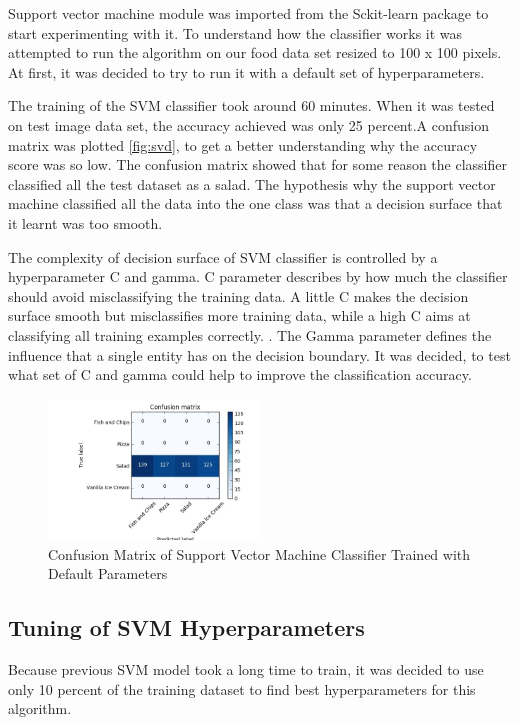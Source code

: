 Support vector machine module was imported from the Sckit-learn package to start experimenting with it. To understand how the classifier works it was attempted to run the algorithm on our food data set resized to 100 x 100 pixels. At first, it was decided to try to run it with a default set of hyperparameters.

The training of the SVM classifier took around 60 minutes. When it was tested on test image data set, the accuracy achieved was only 25 percent.A confusion matrix was plotted \autoref{fig:svd},  to get a better understanding why the accuracy score was so low. The confusion matrix showed that for some reason the classifier classified all the test dataset as a salad. The hypothesis why the support vector machine classified all the data into the one class was that a decision surface that it learnt was too smooth.

The complexity of decision surface of SVM classifier is controlled by a  hyperparameter C and gamma. C parameter describes by how much the classifier should avoid misclassifying the training data. A little C makes the decision surface smooth but misclassifies more training data, while a high C aims at classifying all training examples correctly. \citep{hyper}. The Gamma parameter defines the influence that a single entity has on the decision boundary.  It was decided, to test what set of C and gamma could help to improve the classification accuracy.



\begin{figure}[h]
\centering
\includegraphics[width=0.5\textwidth]{Figures/svm_default.jpg}
\caption{Confusion Matrix of Support Vector Machine Classifier Trained with Default Parameters}
\label{fig:svd}
\end{figure}


\subsection{Tuning of SVM Hyperparameters}

Because previous SVM model took a long time to train, it was decided to use only 10 percent of the training dataset to find best hyperparameters for this algorithm.

